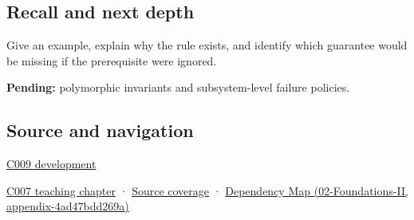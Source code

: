 \subsection{Recall and next depth}\label{recall-and-next-depth}

Give an example, explain why the rule exists, and identify which guarantee would be missing if the prerequisite were ignored.

\textbf{Pending:} polymorphic invariants and subsystem-level failure policies.

\subsection{Source and navigation}\label{source-and-navigation}

\hyperref[appendix-fd090d982a15]{C009 development}

\href{Continuous\%20Notes/Computing\%20Foundations\%20-\%20From\%20Bits\%20to\%20C++\%20and\%20Systems\%20APIs\#Public\%20records\%20and\%20protected\%20invariants}{C007 teaching chapter} · \hyperref[appendix-fd090d982a15]{Source coverage} · \href{}{Dependency Map (02-Foundations-II, appendix-4ad47bdd269a)}
